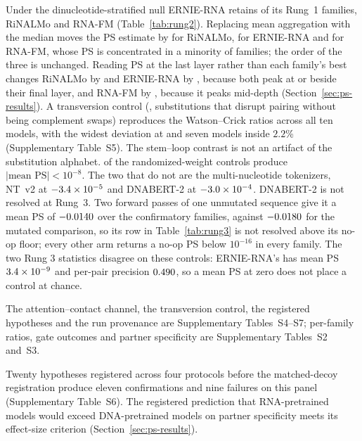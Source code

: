 \documentclass[11pt]{article}
\begin{document}
Under the dinucleotide-stratified null ERNIE-RNA retains \retainErnieRNA{} of
its Rung~1 families, RiNALMo \retainRiNALMo{} and RNA-FM \retainRNAFM{}
(Table~\ref{tab:rung2}). Replacing
mean aggregation with the median moves the PS estimate by
\robustMedianChangeRiNALMo{} for RiNALMo, \robustMedianChangeErnieRNA{} for
ERNIE-RNA and \robustMedianChangeRNAFM{} for RNA-FM, whose PS is concentrated in
a minority of families; the order of the three is unchanged. Reading PS at the
last layer rather than each family's best changes RiNALMo by
\robustLastLayerChangeRiNALMo{} and ERNIE-RNA by
\robustLastLayerChangeErnieRNA{}, because both peak at or beside their final
layer, and RNA-FM by \robustLastLayerChangeRNAFM{}, because it peaks mid-depth
(Section~\ref{sec:ps-results}).
A transversion control (\transversionAlphabet{}, substitutions that disrupt
pairing without being complement swaps) reproduces the Watson--Crick ratios
across all ten models, with the widest deviation \transversionWidestDeviation{}
at \transversionWidest{} and seven models inside $2.2$\%
(Supplementary Table~S5). The stem--loop contrast is not an artifact of
the substitution alphabet. \controlsNearZero{} of the \controlsTotal{} randomized-weight
controls produce $|\text{mean PS}| < 10^{-8}$. The two that do not are the
multi-nucleotide tokenizers, NT~v2 at $-3.4 \times 10^{-5}{}$ and DNABERT-2 at
$-3.0 \times 10^{-4}{}$.
DNABERT-2 is not resolved at Rung~3. Two forward passes of one unmutated
sequence give it a mean PS of $-0.0140{}$ over the \confirmatoryN{} confirmatory
families, against $-0.0180{}$ for the mutated comparison, so its row in
Table~\ref{tab:rung3} is not resolved above its no-op floor; every other arm
returns a no-op PS below $10^{-16}$ in every family.
The two Rung 3 statistics disagree on these controls: ERNIE-RNA's has mean PS
$3.4 \times 10^{-9}{}$ and per-pair precision
$0.490{}$, so a mean PS at zero does
not place a control at chance.

The attention--contact channel, the transversion control, the registered
hypotheses and the run provenance are Supplementary Tables~S4--S7; per-family
ratios, gate outcomes and partner specificity are Supplementary Tables~S2
and~S3.


Twenty hypotheses registered across four protocols before the matched-decoy
registration produce eleven confirmations and nine failures on this panel
(Supplementary Table~S6). The registered prediction that RNA-pretrained models
would exceed DNA-pretrained models on partner specificity meets its effect-size
criterion (Section~\ref{sec:ps-results}).
\end{document}
